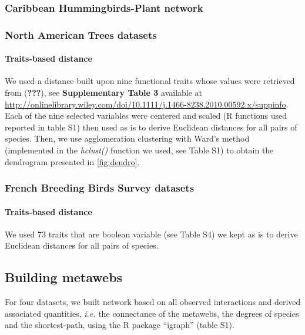 \subsubsection{Caribbean Hummingbirds-Plant
network}\label{caribbean-hummingbirds-plant-network}

\subsubsection{North American Trees
datasets}\label{north-american-trees-datasets}

\paragraph{Traits-based distance}\label{traits-based-distance}

We used a distance built upon nine functional traits whose values were
retrieved from ({\textbf{???}}), see \textbf{Supplementary Table 3}
available at
\url{http://onlinelibrary.wiley.com/doi/10.1111/j.1466-8238.2010.00592.x/suppinfo}.
Each of the nine selected variables were centered and scaled (R
functions used reported in table S1) then used as is to derive Euclidean
distances for all pairs of species. Then, we use agglomeration
clustering with Ward's method (implemented in the \emph{hclust()}
function we used, see Table S1) to obtain the dendrogram presented in
\ref{fig:dendro}.

\subsubsection{French Breeding Birds Survey
datasets}\label{french-breeding-birds-survey-datasets}

\paragraph{Traits-based distance}\label{traits-based-distance-1}

We used 73 traits that are boolean variable (see Table S4) we kept as is
to derive Euclidean distances for all pairs of species.

\subsection{Building metawebs}\label{building-metawebs}

For four datasets, we built network based on all observed interactions
and derived associated quantities, \emph{i.e.} the connectance of the
metawebs, the degrees of species and the shortest-path, using the R
package ``igraph'' (table S1).

